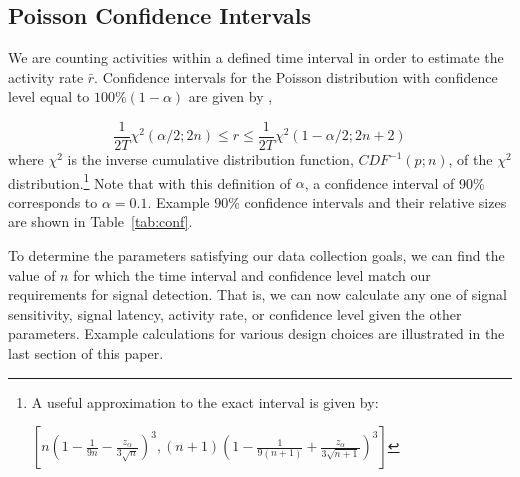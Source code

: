 \documentclass{article}
\begin{document}
\subsection{Poisson Confidence Intervals} 
\label{conf}

We 
\reversemarginpar\marginpar{\raggedleft
%
    \begin{tikzpicture}[scale=0.26]]
\draw [red, very thick, rotate around={0: (0, 0)}] (-0.7, -0.7) rectangle(3.7, 0.7);
%
\draw [very thick, <->] (0.25000000000000006, 0.4330127018922193) -- (1.25, 2.165063509461097) ;
\draw [very thick, <->] (1.75, 2.165063509461097) -- (2.75, 0.4330127018922193) ;
\draw [very thick, <->] (2.5, 0) -- (0.5, 0) ;
%
\draw [orange, ultra thick] (0,0) circle [radius= 0.5 ];
\draw [yellow, ultra thick] ( 1.5 , 2.59807621135 ) circle [radius= 0.5 ];
\draw [green,  ultra thick] ( 3.0 , 0 ) circle [radius= 0.5 ];
    \end{tikzpicture}
%
%
}
are counting activities within a defined time interval in order to estimate the activity rate $\bar{r}$. 
Confidence intervals for the Poisson distribution with confidence level equal to $100\%(1-\alpha)$ 
are given by \cite{George:2012},

\begin{equation}
    \label{eq:chisqconf}
    \frac{1}{2T} \chi^2(\alpha/2;2n) \leq r \leq \frac{1}{2T} \chi^2(1-\alpha/2;2n+2)
\end{equation}
where $\chi^2$ is the inverse cumulative distribution function, $CDF^{-1}(p; n)$, of the $\chi^2$ 
distribution.\footnote{A useful approximation to the exact interval is given by:

$[ n(1 - \frac{1}{9n} - \frac{z_{\alpha}}{3\sqrt{n}})^3 , 
(n+1)(1- \frac{1}{9(n+1)} + \frac{z_{\alpha}}{3\sqrt{n+1}})^3]$ }
Note that with this definition of $\alpha$, a confidence interval of 90\% corresponds to 
$\alpha=0.1$. Example $90\%$ confidence intervals and their relative sizes are shown in 
Table~\ref{tab:conf}.

To determine the parameters satisfying our data collection goals, we can find the value of $n$ for 
which the time interval and confidence level match our requirements for signal detection.  
That is, we can now calculate any one of signal sensitivity, signal latency, activity rate, or confidence 
level given the other parameters. Example calculations for various design choices are illustrated in the 
last section of this paper.
\end{document}
